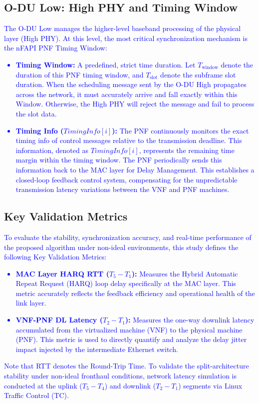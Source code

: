 \documentclass[10pt, conference, letterpaper]{IEEEtran}
\begin{document}
\subsection{O-DU Low: High PHY and Timing Window}
\label{subsec:C_odu_low}
\textcolor{blue}{The O-DU Low manages the higher-level baseband processing of the physical layer (High PHY). At this level, the most critical synchronization mechanism is the nFAPI PNF Timing Window:
\begin{itemize}
\item \textbf{Timing Window:} A predefined, strict time duration. Let $T_{\mathrm{window}}$ denote the duration of this PNF timing window, and $T_{\mathrm{slot}}$ denote the subframe slot duration. When the scheduling message sent by the O-DU High propagates across the network, it must accurately arrive and fall exactly within this Window. Otherwise, the High PHY will reject the message and fail to process the slot data.
\item \textbf{Timing Info ($\mathit{TimingInfo}[i]$):} The PNF continuously monitors the exact timing info of control messages relative to the transmission deadline. This information, denoted as $\mathit{TimingInfo}[i]$, represents the remaining time margin within the timing window. The PNF periodically sends this information back to the MAC layer for Delay Management. This establishes a closed-loop feedback control system, compensating for the unpredictable transmission latency variations between the VNF and PNF machines.
\end{itemize}}


\subsection{Key Validation Metrics}
\label{subsec:D_metrics}
\textcolor{blue}{To evaluate the stability, synchronization accuracy, and real-time performance of the proposed algorithm under non-ideal environments, this study defines the following Key Validation Metrics:
\begin{itemize}
\item \textbf{MAC Layer HARQ RTT ($T_5 - T_1$):} Measures the Hybrid Automatic Repeat Request (HARQ) loop delay specifically at the MAC layer. This metric accurately reflects the feedback efficiency and operational health of the link layer.
\item \textbf{VNF-PNF DL Latency ($T_2 - T_1$):} Measures the one-way downlink latency accumulated from the virtualized machine (VNF) to the physical machine (PNF). This metric is used to directly quantify and analyze the delay jitter impact injected by the intermediate Ethernet switch.
\end{itemize}
Note that RTT denotes the Round-Trip Time. To validate the split-architecture stability under non-ideal fronthaul conditions, network latency simulation is conducted at the uplink ($T_5 - T_4$) and downlink ($T_2 - T_1$) segments via Linux Traffic Control (TC).}
\end{document}
